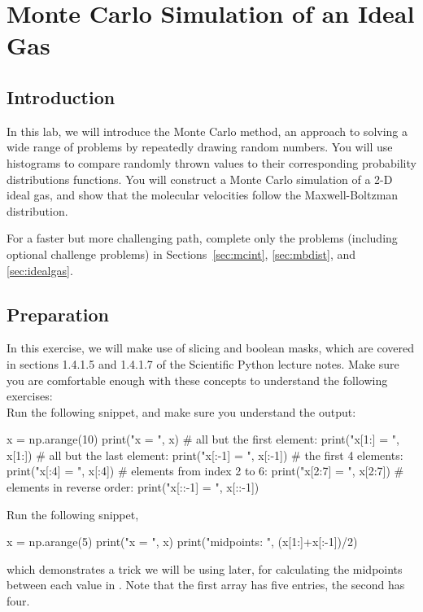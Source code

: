 \chapter{Monte Carlo Simulation of an Ideal Gas}

\section{Introduction}

In this lab, we will introduce the Monte Carlo method, an approach to
solving a wide range of problems by repeatedly drawing random numbers.
You will use histograms to compare randomly thrown values to their
corresponding probability distributions functions.  You will construct
a Monte Carlo simulation of a 2-D ideal gas, and show that the
molecular velocities follow the Maxwell-Boltzman distribution.

For a faster but more challenging path, complete only the problems
(including optional challenge problems) in Sections~\ref{sec:mcint},
\ref{sec:mbdist}, and \ref{sec:idealgas}.

\section{Preparation}

In this exercise, we will make use of slicing and boolean masks, which
are covered in sections 1.4.1.5 and 1.4.1.7 of the Scientific Python
lecture notes.  Make sure you are comfortable enough with these
concepts to understand the following exercises:\\

\plot Run the following snippet, and make sure you understand the output:
\begin{python}
x = np.arange(10)
print("x       = ", x)
# all but the first element:
print("x[1:]   = ", x[1:])
# all but the last element:
print("x[:-1]  = ", x[:-1])
# the first 4 elements:
print("x[:4]   = ", x[:4])
# elements from index 2 to 6:
print("x[2:7]  = ", x[2:7])
# elements in reverse order:
print("x[::-1] = ", x[::-1])
\end{python} \vskip 0.25cm

\newpage

\plot Run the following snippet, 
\begin{python}
x = np.arange(5)
print("x =         ", x)
print("midpoints:  ", (x[1:]+x[:-1])/2)
\end{python}
which demonstrates a trick we will be using later, for calculating the
midpoints between each value in .  Note that the first array
has five entries, the second has four.\\

